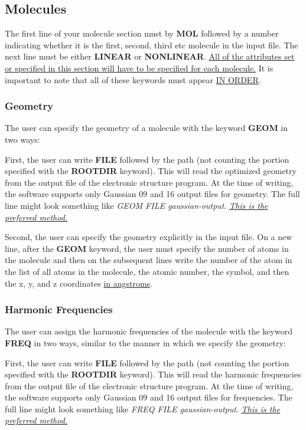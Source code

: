 \documentclass[a4paper,12pt]{article}
\begin{document}
\subsection{Molecules}
The first line of your molecule section must by \textbf{MOL} followed by a number indicating whether it is the first, second, third etc molecule in the input file. The next line must be either \textbf{LINEAR} or \textbf{NONLINEAR}. \underline{All of the attributes set or specified in this section will have to be specified for each molecule.} It is important to note that all of these keywords must appear \underline{IN ORDER}.

\subsubsection{Geometry}
The user can specify the geometry of a molecule with the keyword \textbf{GEOM} in two ways:

First, the user can write \textbf{FILE} followed by the path (not counting the portion specified with the \textbf{ROOTDIR} keyword). This will read the optimized geometry from the output file of the electronic structure program.
At the time of writing, the software supports only Gaussian 09 and 16 output files for geometry. The full line might look something like \textit{GEOM FILE gaussian-output}. \underline{\textit{This is the preferred method.}}

Second, the user can specify the geometry explicitly in the input file. On a new line, after the \textbf{GEOM} keyword, the user must specify the number of atoms in the molecule and then on the subsequent lines write the number of the atom in the list of all atoms in the molecule, the atomic number, the symbol, and then the x, y, and z coordinates \underline{in angstroms}.

\subsubsection{Harmonic Frequencies}
The user can assign the harmonic frequencies of the molecule with the keyword \textbf{FREQ} in two ways, similar to the manner in which we specify the geometry:

First, the user can write \textbf{FILE} followed by the path (not counting the portion specified with the \textbf{ROOTDIR} keyword). This will read the harmonic frequencies from the output file of the electronic structure program.
At the time of writing, the software supports only Gaussian 09 and 16 output files for frequencies. The full line might look something like \textit{FREQ FILE gaussian-output}. \underline{\textit{This is the preferred method.}}
\end{document}
